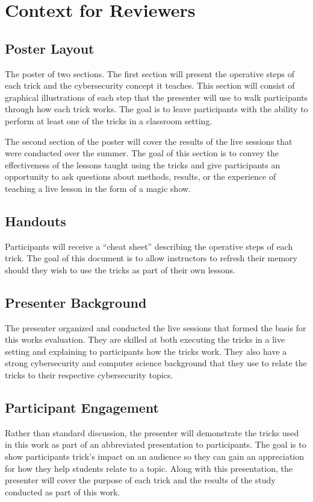 \documentclass[sigconf]{acmart}
\begin{document}



\newpage
\section{Context for Reviewers}
\subsection{Poster Layout}
The poster of two sections. The first section will present the operative
steps of each trick and the cybersecurity concept it teaches.  This section
will consist of graphical illustrations of each step that the presenter
will use to walk participants through how each trick works.  The goal is to
leave participants with the ability to perform at least one of the tricks
in a classroom setting.

The second section of the poster will cover the results of the live
sessions that were conducted over the summer.  The goal of this section is
to convey the effectiveness of the lessons taught using the tricks and give
participants an opportunity to ask questions about methods, results, or the
experience of teaching a live lesson in the form of a magic show.


\subsection{Handouts}

Participants will receive a ``cheat sheet'' describing the operative steps
of each trick.  The goal of this document is to allow instructors to
refresh their memory should they wish to use the tricks as part of their
own lessons.

\subsection{Presenter Background}

The presenter organized and conducted the live sessions that formed the
basis for this works evaluation.  They are skilled at both executing the
tricks in a live setting and explaining to participants how the tricks
work.  They also have a strong cybersecurity and computer science
background that they use to relate the tricks to their respective
cybersecurity topics.

\subsection{Participant Engagement}

Rather than standard discussion, the presenter will demonstrate the
tricks used in this work as part of an abbreviated presentation
to participants.
The goal is to show participants trick's impact on an audience so they can
gain an appreciation for how they help students relate to a topic.
Along with this presentation, the presenter will
cover the purpose of each trick and the results of the study conducted as
part of this work.
\end{document}
